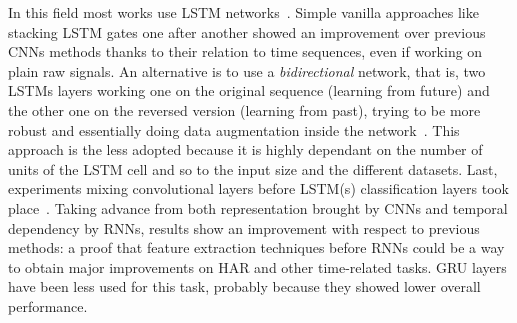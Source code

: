 In this field most works use LSTM networks~\cite{Guan-LSTM-wearables}.
Simple vanilla approaches like stacking LSTM gates one after another showed an improvement over previous CNNs methods thanks to their relation to time sequences, even if working on plain raw signals.
An alternative is to use a \textit{bidirectional} network, that is, two LSTMs layers working one on the original sequence (learning from future) and the other one on the reversed version (learning from past), trying to be more robust and essentially doing data augmentation inside the network~\cite{Hammerla-DeepConvRec}.
This approach is the less adopted because it is highly dependant on the number of units of the LSTM cell and so to the input size and the different datasets.
Last, experiments mixing convolutional layers before LSTM(s) classification layers took place~\cite{Ordonez-CNN-LSTM}.
Taking advance from both representation brought by CNNs and temporal dependency by RNNs, results show an improvement with respect to previous methods: a proof that feature extraction techniques before RNNs could be a way to obtain major improvements on HAR and other time-related tasks.
GRU layers have been less used for this task, probably because they showed lower overall performance\cite{Park-DNN-smartmultisensor,Arifoglu-RNN-HAR}.

